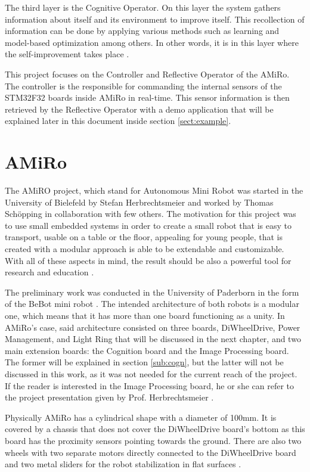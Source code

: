 \documentclass[12pt]{report}%
\begin{document}
The third layer is the Cognitive Operator. On this layer the system gathers information about itself and its environment to improve itself. This recollection of information can be done by applying various methods such as learning and model-based optimization among others. In other words, it is in this layer where the self-improvement takes place \cite{ocmAuto}.

This project focuses on the Controller and Reflective Operator of the AMiRo. The controller is the responsible for commanding the internal sensors of the STM32F32 boards inside AMiRo in real-time. This sensor information is then retrieved by the Reflective Operator with a demo application that will be explained later in this document inside section \ref{sect:example}.

\section{AMiRo}
The AMiRO project, which stand for Autonomous Mini Robot was started in the University of Bielefeld by Stefan Herbrechtsmeier and worked by Thomas Schöpping in collaboration with few others. The motivation for this project was to use small embedded systems in order to create a small robot that is easy to transport, usable on a table or the floor, appealing for young people, that is created with a modular approach is able to be extendable and customizable. With all of these aspects in mind, the result should be also a powerful tool for research and education \cite{AMiRo_ppt_v1}.

The preliminary work was conducted in the University of Paderborn in the form of the BeBot mini robot \cite{AMiRo_ppt_v1}. The intended architecture of both robots is a modular one, which means that it has more than one board functioning as a unity. In AMiRo's case, said architecture consisted on three boards, DiWheelDrive, Power Management, and Light Ring that will be discussed in the next chapter, and two main extension boards: the Cognition board and the Image Processing board. The former will be explained in section \ref{sub:cogn}, but the latter will not be discussed in this work, as it was not needed for the current reach of the project. If the reader is interested in the Image Processing board, he or she can refer to the project presentation given by Prof. Herbrechtsmeier \cite{AMiRo_ppt_v2}.

Physically AMiRo has a cylindrical shape with a diameter of 100mm. It is covered by a chassis that does not cover the DiWheelDrive board's bottom as this board has the proximity sensors pointing towards the ground. There are also two wheels with two separate motors directly connected to the DiWheelDrive board and two metal sliders for the robot stabilization in flat surfaces \cite{AMiRo_paper_modular}.
\end{document}
